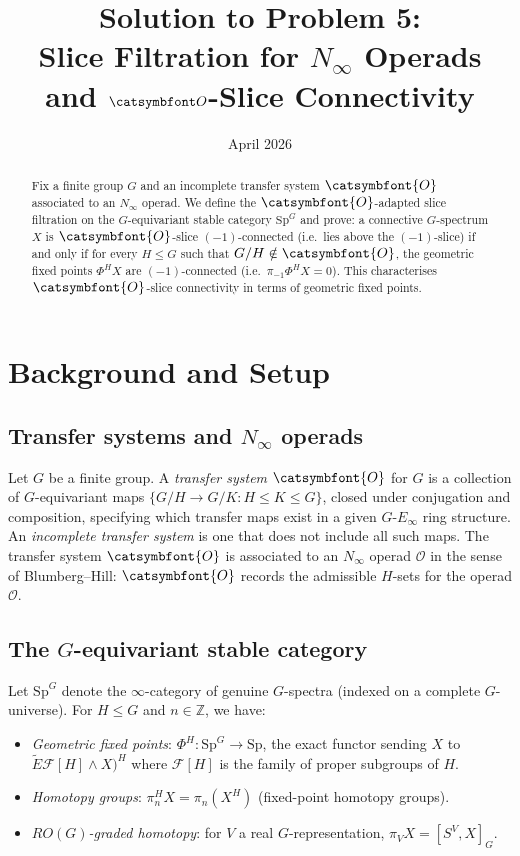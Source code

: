 \documentclass[12pt]{article}
\title{Solution to Problem 5:\\
Slice Filtration for $N_\infty$ Operads and $\aO$-Slice Connectivity}
\author{}
\date{April 2026}
\theoremstyle{definition}
\theoremstyle{remark}
\newcommand{\aO}{{\catsymbfont{O}}}
\begin{document}
\maketitle

\begin{abstract}
Fix a finite group $G$ and an incomplete transfer system $\aO$ associated to an
$N_\infty$ operad.  We define the $\aO$-adapted slice filtration on the
$G$-equivariant stable category $\mathrm{Sp}^G$ and prove: a connective
$G$-spectrum $X$ is $\aO$-slice $(-1)$-connected (i.e.\ lies above the
$(-1)$-slice) if and only if for every $H \leq G$ such that $G/H \notin \aO$,
the geometric fixed points $\Phi^H X$ are $(-1)$-connected (i.e.\ $\pi_{-1}\Phi^H X = 0$).
This characterises $\aO$-slice connectivity in terms of geometric fixed points.
\end{abstract}

\section{Background and Setup}

\subsection{Transfer systems and $N_\infty$ operads}

Let $G$ be a finite group.  A \emph{transfer system} $\aO$ for $G$ is a
collection of $G$-equivariant maps $\{G/H \to G/K : H \leq K \leq G\}$,
closed under conjugation and composition, specifying which transfer maps exist
in a given $G$-$E_\infty$ ring structure.  An \emph{incomplete transfer system}
is one that does not include all such maps.  The transfer system $\aO$ is
associated to an $N_\infty$ operad $\mathcal{O}$ in the sense of Blumberg--Hill:
$\aO$ records the admissible $H$-sets for the operad $\mathcal{O}$.

\subsection{The $G$-equivariant stable category}

Let $\mathrm{Sp}^G$ denote the $\infty$-category of genuine $G$-spectra
(indexed on a complete $G$-universe).  For $H\leq G$ and $n\in\mathbb{Z}$, we
have:
\begin{itemize}
\item \emph{Geometric fixed points}: $\Phi^H:\mathrm{Sp}^G\to\mathrm{Sp}$,
  the exact functor sending $X$ to $\tilde{E}\mathcal{F}[H] \wedge X)^H$
  where $\mathcal{F}[H]$ is the family of proper subgroups of $H$.
\item \emph{Homotopy groups}: $\pi_n^H X = \pi_n(X^H)$ (fixed-point homotopy
  groups).
\item \emph{$RO(G)$-graded homotopy}: for $V$ a real $G$-representation,
  $\pi_V X = [S^V, X]_G$.
\end{itemize}
\end{document}
